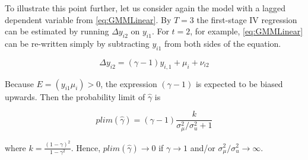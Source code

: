 \documentclass[a4paper, 12pt]{article}
\begin{document}
To illustrate this point further, let us consider again the model with a lagged dependent variable from \eqref{eq:GMMLinear}. By $T=3$ the first-stage IV regression can be estimated by running $\Delta y_{i2}$ on $y_{i1}$. For $t=2$, for example, \eqref{eq:GMMLinear} can be re-written simply by subtracting $y_{i1}$ from both sides of the equation.


\begin{equation} \label{eq:GMM-Blundell}
\Delta y_{i2} = (\gamma - 1) y_{i,1} + \mu_{i} + \nu_{i2}
\end{equation}


Because $E=(y_{i1} \mu_{i})>0$, the expression $(\gamma - 1)$ is expected to be biased upwards. Then the probability limit of  $\hat{\gamma}$ is

\begin{equation} \label{eq:GMM-plim}
plim(\hat{\gamma}) = (\gamma - 1) \frac{k}{\sigma^2_{\mu} / \sigma^2_{u} + 1}
\end{equation}


where $k = \frac{(1-\gamma)^2}{1-\gamma^2}$. Hence, $plim(\hat{\gamma}) \to 0$ if $\gamma\to 1$ and/or $\sigma^2_{\mu} / \sigma^2_{u} \to\infty$.
\end{document}
